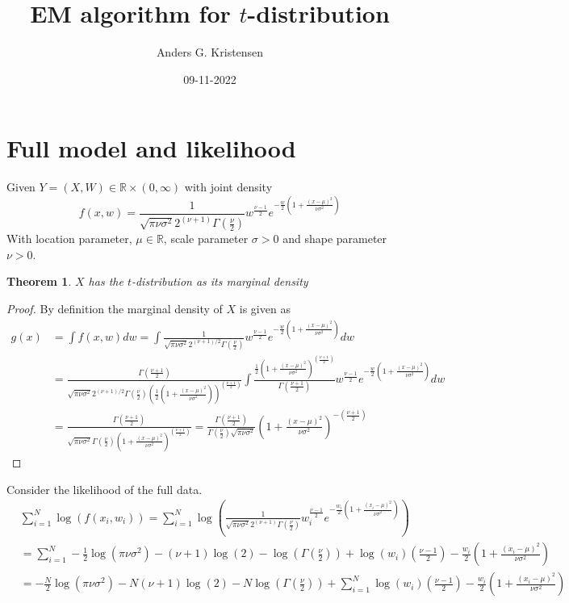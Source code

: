 \documentclass[a4paper, 11 pt]{article}
\title{EM algorithm for $t$-distribution}
\author{Anders G. Kristensen}
\date{09-11-2022}
\newtheorem{theorem}{Theorem}[section]
\begin{document}
\maketitle
\section{Full model and likelihood}
\noindent Given $Y = (X,W)\in\mathbb{R} \times (0,\infty)$ with joint density 
\[
    f(x,w) = \frac{1}{\sqrt{\pi\nu\sigma^2}2^{(\nu+1)}\Gamma(\frac{\nu}{2})}w^{\frac{\nu-1}{2}}e^{-\frac{w}{2}\left(1+\frac{(x-\mu)^2}{\nu\sigma^2}\right)}
\]
With location parameter, $\mu\in\mathbb{R}$, scale parameter $\sigma>0$ and shape parameter $\nu>0$. 
\begin{theorem}
    $X$ has the $t$-distribution as its marginal density
\end{theorem}
\begin{proof}
    By definition the marginal density of $X$ is given as
    \begin{align*}
        g(x) &= \int f(x,w) dw = \int \frac{1}{\sqrt{\pi\nu\sigma^2}2^{(\nu+1)/2}\Gamma(\frac{\nu}{2})}w^{\frac{\nu-1}{2}}e^{-\frac{w}{2}\left(1+\frac{(x-\mu)^2}{\nu\sigma^2}\right)} dw \\
        &= \frac{\Gamma(\frac{\nu+1}{2})}{\sqrt{\pi\nu\sigma^2}2^{(\nu+1)/2}\Gamma(\frac{\nu}{2})\left(\frac{1}{2}\left(1+\frac{(x-\mu)^2}{\nu\sigma^2}\right)\right)^{(\frac{\nu+1}{2})}} \int \frac{\frac{1}{2}\left(1+\frac{(x-\mu)^2}{\nu\sigma^2}\right)^{(\frac{\nu+1}{2})}}{\Gamma(\frac{\nu+1}{2})} w^{\frac{\nu-1}{2}}e^{-\frac{w}{2}\left(1+\frac{(x-\mu)^2}{\nu\sigma^2}\right)}dw\\
        &= \frac{\Gamma(\frac{\nu+1}{2})}{\sqrt{\pi\nu\sigma^2}\Gamma(\frac{\nu}{2})\left(1+\frac{(x-\mu)^2}{\nu\sigma^2}\right)^{(\frac{\nu+1}{2})}} = \frac{\Gamma(\frac{\nu+1}{2})}{\Gamma(\frac{\nu}{2})\sqrt{\pi\nu\sigma^2}}\left(1+\frac{(x-\mu)^2}{\nu\sigma^2}\right)^{-\left(\frac{\nu+1}{2}\right)}
    \end{align*}
\end{proof}
\noindent Consider the likelihood of the full data.
\begin{align*}
    &\sum_{i = 1}^N \log\left(f(x_i,w_i)\right) =  \sum_{i = 1}^N \log\left(\frac{1}{\sqrt{\pi\nu\sigma^2}2^{(\nu+1)}\Gamma(\frac{\nu}{2})}w_i^{\frac{\nu-1}{2}}e^{-\frac{w_i}{2}\left(1+\frac{(x_i-\mu)^2}{\nu\sigma^2}\right)}\right) \\
    &= \sum_{i = 1}^N -\frac{1}{2}\log\left(\pi\nu\sigma^2\right) - \left(\nu+1\right)\log\left(2\right)-\log\left(\Gamma\left(\frac{\nu}{2}\right)\right) + \log\left(w_i\right)\left(\frac{\nu-1}{2}\right)-\frac{w_i}{2}\left(1+\frac{(x_i-\mu)^2}{\nu\sigma^2}\right) \\
    &= -\frac{N}{2}\log\left(\pi\nu\sigma^2\right) - N\left(\nu+1\right)\log\left(2\right)-N\log\left(\Gamma\left(\frac{\nu}{2}\right)\right) + \sum_{i = 1}^N \log\left(w_i\right)\left(\frac{\nu-1}{2}\right)-\frac{w_i}{2}\left(1+\frac{(x_i-\mu)^2}{\nu\sigma^2}\right)
\end{align*}
\end{document}
